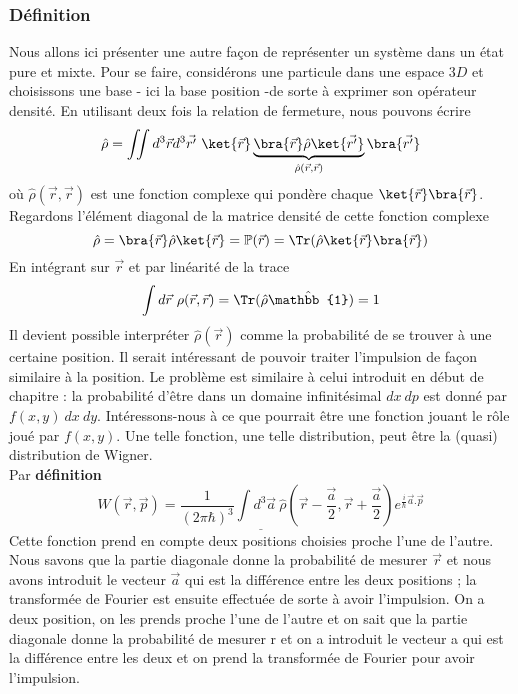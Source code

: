 \subsubsection{Définition}
Nous allons ici présenter une autre façon de représenter un système dans un état pure et mixte. Pour se faire, 
considérons une particule dans une espace $3D$ et choisissons une base - ici la base position -de sorte à exprimer 
son opérateur densité. En utilisant deux fois la relation de fermeture, nous pouvons écrire
\begin{equation}
\hat{\rho} = \iint d^3\vec{r} d^3\vec{r'}\ \ket{\vec{r}}\underbrace{\bra{\vec{r}}\hat{\rho}\ket{\vec{r'}}}_{\hat\rho(\vec{r},\vec{r})}\bra{\vec{r'}}
\end{equation}
où $\hat\rho(\vec{r},\vec{r})$ est une fonction complexe qui pondère chaque $\ket{\vec{r}}\bra{\vec{r}}$. Regardons l'élément 
diagonal de la matrice densité de cette fonction complexe
\begin{equation}
\hat{\rho} = \bra{\vec{r}}\hat{\rho}\ket{\vec{r}} = \mathbb{P}(\vec{r}) = \Tr(\hat{\rho}\ket{\vec{r}}\bra{\vec{r}})
\end{equation}
En intégrant sur  $\vec{r}$ et par linéarité de la trace
\begin{equation}
\int d\vec{r}\ \rho(\vec{r},\vec{r}) = \Tr(\hat{\rho}\hat{\mathbb{1}}) = 1
\end{equation}
Il devient possible interpréter $\hat \rho(\vec{r})$ comme la probabilité de se trouver à une certaine position. Il serait 
intéressant de pouvoir traiter l'impulsion de façon similaire à la position. Le problème est similaire à celui introduit 
en début de chapitre : la probabilité d'être dans un domaine infinitésimal $dx\ dp$ est donné par $f(x,y)\ dx\ dy$. 
Intéressons-nous à ce que pourrait être une fonction jouant le rôle joué par $f(x,y)$. Une telle fonction, une telle 
distribution, peut être la (quasi) distribution de Wigner.\\

Par \textbf{définition}
\begin{equation}
\underline{W(\vec{r},\vec{p}) = \dfrac{1}{(2\pi\hbar)^3}\int d^3\vec{a}\ \hat\rho\left(\vec{r}-\frac{\vec{a}}{2},\vec{r}
+\frac{\vec{a}}{2}\right)e^{\frac{i}{\hbar}\vec{a}.\vec{p}}}
\end{equation}
Cette fonction prend en compte deux positions choisies proche l'une de l'autre. Nous savons que la partie diagonale donne 
la probabilité de mesurer $\vec{r}$ et nous avons introduit le vecteur $\vec{a}$ qui est la différence entre les deux 
positions ; la transformée de Fourier est ensuite effectuée de sorte à avoir l'impulsion.
On a deux position, on les prends proche l'une de l'autre et on sait que la partie diagonale donne la probabilité de mesurer r et on a introduit le vecteur a qui est la différence entre les deux et on prend la transformée de Fourier pour avoir l'impulsion.

